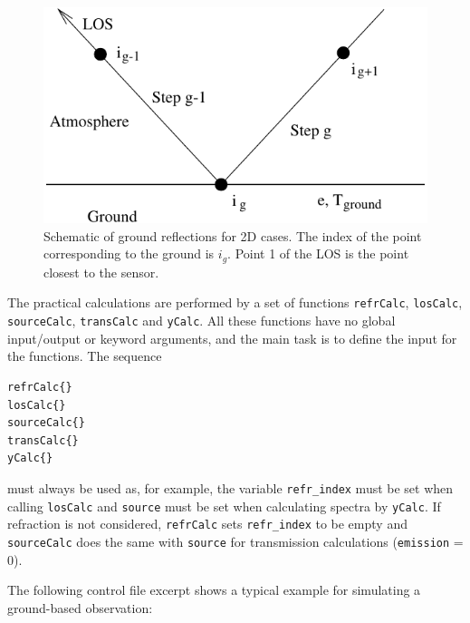   \begin{figure}
   \begin{center}
     \includegraphics*[width=0.75\hsize]{Figs/ground}
    \caption{Schematic of ground reflections for 2D cases. The index 
             of the point corresponding to the ground is $i_g$. Point 1
             of the LOS is the point closest to the sensor. }  
    \label{fig:los1d:ground}  
   \end{center}
  \end{figure}
 


 \label{sec:los:cfe}
 
 The practical calculations are performed by a set of functions
 \verb|refrCalc|, \verb|losCalc|, \verb|sourceCalc|, \verb|transCalc|
 and \verb|yCalc|. All these functions have no global input/output or
 keyword arguments, and the main task is to define the input for the
 functions. The sequence {\footnotesize \begin{verbatim}
refrCalc{}
losCalc{}
sourceCalc{}
transCalc{}
yCalc{} 
\end{verbatim} 
} 
\noindent 
must always be used as, for example, the variable \verb|refr_index|
must be set when calling \verb|losCalc| and \verb|source|
must be set when calculating spectra by \verb|yCalc|. If refraction
is not considered, \verb|refrCalc| sets \verb|refr_index| to be empty
and \verb|sourceCalc| does the same with \verb|source| for transmission
calculations (\verb|emission| = 0).



 The following control file excerpt shows a typical example for
 simulating a ground-based observation:

